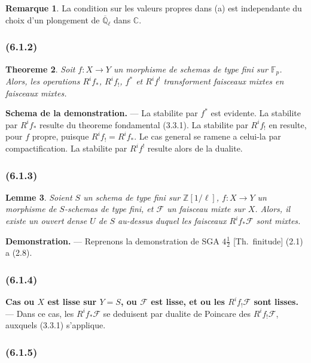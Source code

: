 \documentclass[12pt,a4paper]{article}
\theoremstyle{plain}
\newtheorem{theorem}{Theoreme}[section]
\newtheorem{lemma}[theorem]{Lemme}
\theoremstyle{definition}
\newtheorem{remark}[theorem]{Remarque}
\theoremstyle{remark}
\newcommand{\bbZ}{\mathbb{Z}}
\newcommand{\bbC}{\mathbb{C}}
\newcommand{\scrF}{\mathscr{F}}
\newcommand{\Qlb}{\overline{\mathbb{Q}}_\ell}
\newcommand{\Fp}{\mathbb{F}_p}
\begin{document}
\begin{remark}
La condition sur les valeurs propres dans (a) est independante du choix d'un plongement de $\Qlb$ dans $\bbC$.
\end{remark}

\subsubsection*{\textup{(6.1.2)}}

\begin{theorem}
Soit $f : X \to Y$ un morphisme de schemas de type fini sur $\Fp$. Alors, les operations $R^i f_*$, $R^i f_!$, $f^*$ et $R^i f^!$ transforment faisceaux mixtes en faisceaux mixtes.
\end{theorem}

\textbf{Schema de la demonstration.} --- La stabilite par $f^*$ est evidente. La stabilite par $R^i f_*$ resulte du theoreme fondamental (3.3.1). La stabilite par $R^i f_!$ en resulte, pour $f$ propre, puisque $R^i f_! = R^i f_*$. Le cas general se ramene a celui-la par compactification. La stabilite par $R^i f^!$ resulte alors de la dualite.

\subsubsection*{\textup{(6.1.3)}}

\begin{lemma}
Soient $S$ un schema de type fini sur $\bbZ[1/\ell]$, $f : X \to Y$ un morphisme de $S$-schemas de type fini, et $\scrF$ un faisceau mixte sur $X$. Alors, il existe un ouvert dense $U$ de $S$ au-dessus duquel les faisceaux $R^i f_* \scrF$ sont mixtes.
\end{lemma}

\textbf{Demonstration.} --- Reprenons la demonstration de SGA $4\frac{1}{2}$ [Th.~finitude] (2.1) a (2.8).

\subsubsection*{\textup{(6.1.4)}}

\textbf{Cas ou $X$ est lisse sur $Y = S$, ou $\scrF$ est lisse, et ou les $R^i f_! \scrF$ sont lisses.} --- Dans ce cas, les $R^i f_* \scrF$ se deduisent par dualite de Poincare des $R^i f_! \scrF$, auxquels (3.3.1) s'applique.

\subsubsection*{\textup{(6.1.5)}}
\end{document}
